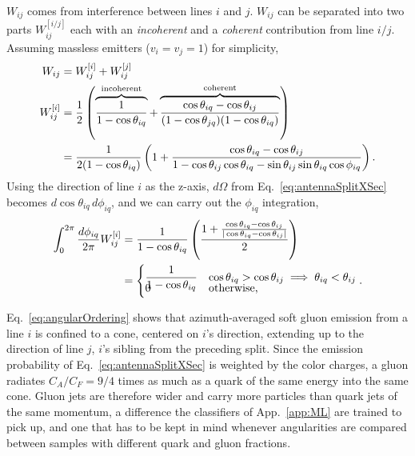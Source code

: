 \(W_{ij}\) comes from interference between lines \(i\) and \(j\). \(W_{ij}\) can be separated into two parts  \(W^{[i/j]}_{ij}\) each with an \emph{incoherent} and a \emph{coherent} contribution from line \(i/j\). Assuming massless emitters (\(v_i=v_j=1\)) for simplicity,
\begin{align}
	W_{ij}       & = W^{[i]}_{ij} + W^{[j]}_{ij}\notag                                                                                                                                                                         \\
	W^{[i]}_{ij} & = \frac{1}{2}\left(\overbrace{\frac{1}{1-\cos\theta_{iq}}}^\mathrm{incoherent} + \overbrace{\frac{\cos\theta_{iq}-\cos\theta_{ij}}{(1-\cos\theta_{jq}) (1-\cos\theta_{iq})}}^\mathrm{coherent}\right)\notag \\
	             & =  \frac{1}{2(1-\cos\theta_{iq})}\left(1 + \frac{\cos\theta_{iq}-\cos\theta_{ij}}{1-\cos\theta_{ij}\cos\theta_{iq} - \sin\theta_{ij}\sin\theta_{iq}\cos\phi_{iq}}\right).
	\label{eq:antennaSplit}
\end{align}
Using the direction of line \(i\) as the z-axis, \(d\Omega \)  from Eq.~\ref{eq:antennaSplitXSec} becomes \(d\cos\theta_{iq}\,d\phi_{iq}\), and we can carry out the \(\phi_{iq}\) integration,
\begin{align}
	\int_0^{2\pi}\frac{d\phi_{iq}}{2\pi}W^{[i]}_{ij} & = \frac{1}{1-\cos\theta_{iq}}\left(\frac{1 + \frac{\cos\theta_{iq}-\cos\theta_{ij}}{|\cos\theta_{iq}-\cos\theta_{ij}|}}{2}\right) \notag \\
	                                                 & = \begin{cases}
		                                                     \dfrac{1}{1-\cos\theta_{iq}} & \cos\theta_{iq} > \cos\theta_{ij} \implies \theta_{iq} < \theta_{ij} \\[-10pt]
		                                                     0                            & \text{otherwise,}
	                                                     \end{cases}.
	\label{eq:angularOrdering}
\end{align}

Eq.~\ref{eq:angularOrdering}  shows that azimuth-averaged soft gluon emission from a line \(i\) is confined to a cone, centered on \(i\)'s direction, extending up to the direction of line \(j\), \(i\)'s sibling from the preceding split.
%
Since the emission probability of Eq.~\ref{eq:antennaSplitXSec} is weighted by the color charges, a gluon radiates \(C_A/C_F = 9/4\) times as much as a quark of the same energy into the same cone.
%
Gluon jets are therefore wider and carry more particles than quark jets of the same momentum, a difference the classifiers of App.~\ref{app:ML} are trained to pick up, and one that has to be kept in mind whenever angularities are compared between samples with different quark and gluon fractions.

